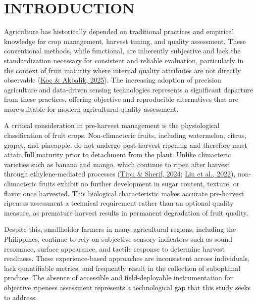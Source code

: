 \chapter{INTRODUCTION}

\begin{thesisprose}

Agriculture has historically depended on traditional practices and empirical knowledge for crop management, harvest timing, and quality assessment. These conventional methods, while functional, are inherently subjective and lack the standardization necessary for consistent and reliable evaluation, particularly in the context of fruit maturity where internal quality attributes are not directly observable (\hyperlink{cite.koc2025}{Koç \& Akbalik, 2025}). The increasing adoption of precision agriculture and data-driven sensing technologies represents a significant departure from these practices, offering objective and reproducible alternatives that are more suitable for modern agricultural quality assessment.

A critical consideration in pre-harvest management is the physiological classification of fruit crops. Non-climacteric fruits, including watermelon, citrus, grapes, and pineapple, do not undergo post-harvest ripening and therefore must attain full maturity prior to detachment from the plant. Unlike climacteric varieties such as banana and mango, which continue to ripen after harvest through ethylene-mediated processes (\hyperlink{cite.tipu2024}{Tipu \& Sherif, 2024}; \hyperlink{cite.liu2022}{Liu et al., 2022}), non-climacteric fruits exhibit no further development in sugar content, texture, or flavor once harvested. This biological characteristic makes accurate pre-harvest ripeness assessment a technical requirement rather than an optional quality measure, as premature harvest results in permanent degradation of fruit quality.

Despite this, smallholder farmers in many agricultural regions, including the Philippines, continue to rely on subjective sensory indicators such as sound resonance, surface appearance, and tactile response to determine harvest readiness. These experience-based approaches are inconsistent across individuals, lack quantifiable metrics, and frequently result in the collection of suboptimal produce. The absence of accessible and field-deployable instrumentation for objective ripeness assessment represents a technological gap that this study seeks to address.


\end{thesisprose}
